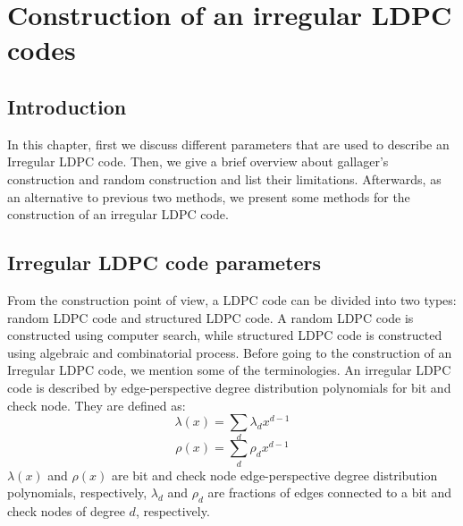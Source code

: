 \begin{comment}
\documentclass[12]{report} %

\usepackage{graphicx} %
\usepackage{rotating}
\usepackage{amsmath}  %
\usepackage{amssymb}  %
\usepackage{algorithm}
\usepackage{algorithmic}
\usepackage{tikz}
\usepackage{verbatim}
\usepackage[T1]{fontenc}
\usepackage{a4}

\addtolength{\textwidth}{8mm}




\end{comment}
\chapter{Construction of an irregular LDPC codes}\label{chap:"irr"}
\section{Introduction}
In this chapter, first we discuss different parameters that are used to describe an Irregular LDPC code. Then, we give a brief overview about gallager's construction and random construction and list their limitations. Afterwards, as an alternative to previous two methods, we present some methods for the construction of an irregular LDPC code. 

\section{Irregular LDPC code parameters}\label{section:"irrpara"}
From the construction point of view, a LDPC code can be divided into two types: random LDPC code and structured LDPC code. A random LDPC code is constructed using computer search, while structured LDPC code is constructed using algebraic and combinatorial process. Before going to the construction of an Irregular LDPC code, we mention some of the terminologies. An irregular LDPC code is described by edge-perspective degree distribution polynomials for bit and check node. They are defined as:
\begin{equation*}
 \lambda(x)=\sum_d \lambda_dx^{d-1}
\end{equation*}
%
\begin{equation*}
 \rho(x)=\sum_d \rho_dx^{d-1}
\end{equation*}
%
$\lambda(x)$ and $\rho(x)$ are bit and check node edge-perspective degree distribution polynomials, respectively, $\lambda_d$ and $\rho_d$ are fractions of edges connected to a bit and check nodes of degree $d$, respectively.


